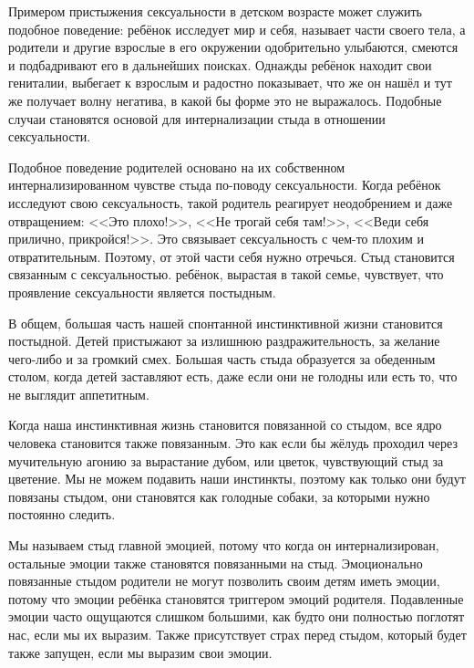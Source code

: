 \documentclass[10pt, fleqn]{article}
\begin{document}
Примером пристыжения сексуальности в детском возрасте может служить подобное поведение: ребёнок исследует мир и себя, называет части своего тела, а родители и другие взрослые в его окружении одобрительно улыбаются, смеются и подбадривают его в дальнейших поисках. Однажды ребёнок находит свои гениталии, выбегает к взрослым и радостно показывает, что же он нашёл и тут же получает волну негатива, в какой бы форме это не выражалось. Подобные случаи становятся основой для интернализации стыда в отношении сексуальности.

Подобное поведение родителей основано на их собственном интернализированном чувстве стыда по-поводу сексуальности. Когда ребёнок исследуют свою сексуальность, такой родитель реагирует неодобрением и даже отвращением: <<Это плохо!>>, <<Не трогай себя там!>>, <<Веди себя прилично, прикройся!>>. Это связывает сексуальность с чем-то плохим и отвратительным. Поэтому, от этой части себя нужно отречься. Стыд становится связанным с сексуальностью.
ребёнок, вырастая в такой семье, чувствует, что проявление сексуальности является постыдным.


В общем, большая часть нашей спонтанной инстинктивной жизни становится постыдной. Детей пристыжают за излишнюю раздражительность, за желание чего-либо и за громкий смех. Большая часть стыда образуется за обеденным столом, когда детей заставляют есть, даже если они не голодны или есть то, что не выглядит аппетитным.

Когда наша инстинктивная жизнь становится повязанной со стыдом, все ядро человека становится также повязанным. Это как если бы жёлудь проходил через мучительную агонию за вырастание дубом, или цветок, чувствующий стыд за цветение. Мы не можем подавить наши инстинкты, поэтому как только они будут повязаны стыдом, они становятся как голодные собаки, за которыми нужно постоянно следить.



Мы называем стыд главной эмоцией, потому что когда он интернализирован, остальные эмоции также становятся повязанными на стыд. Эмоционально повязанные стыдом родители не могут позволить своим детям иметь эмоции, потому что эмоции ребёнка становятся триггером эмоций родителя. Подавленные эмоции часто ощущаются слишком большими, как будто они полностью поглотят нас, если мы их выразим. Также присутствует страх перед стыдом, который будет также запущен, если мы выразим свои эмоции.


\end{document}
